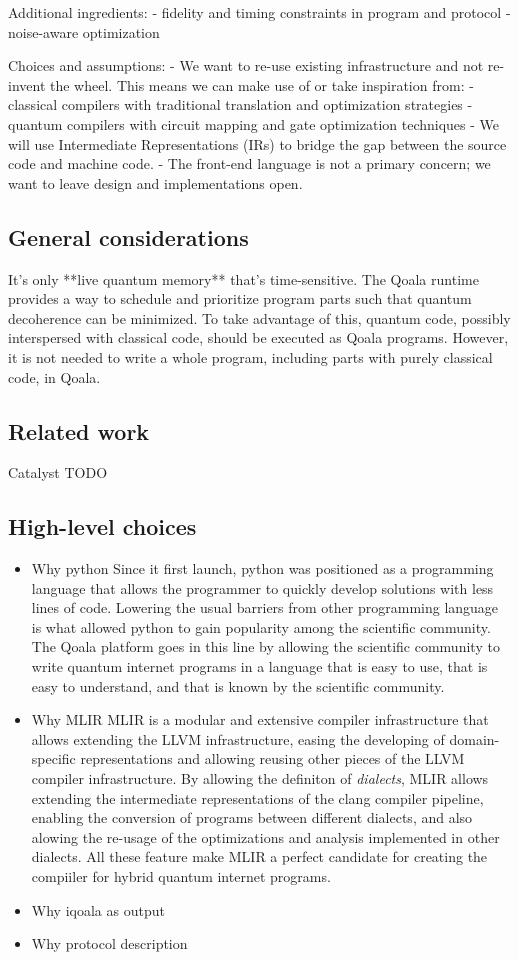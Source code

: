 Additional ingredients:
- fidelity and timing constraints in program and protocol
- noise-aware optimization


Choices and assumptions:
- We want to re-use existing infrastructure and not re-invent the wheel. This means we can make use of or take inspiration from:
  - classical compilers with traditional translation and optimization strategies
  - quantum compilers with circuit mapping and gate optimization techniques
- We will use Intermediate Representations (IRs) to bridge the gap between the source code and machine code.
- The front-end language is not a primary concern; we want to leave design and implementations open.

\subsection{General considerations}
It's only **live quantum memory** that's time-sensitive.
The Qoala runtime provides a way to schedule and prioritize program parts such that quantum decoherence can be minimized.
To take advantage of this, quantum code, possibly interspersed with classical code, should be executed as Qoala programs.
However, it is not needed to write a whole program, including parts with purely classical code, in Qoala.


\subsection{Related work}
Catalyst
TODO

\subsection{High-level choices}
\begin{itemize}
\item Why python
  Since it first launch, python was positioned as a programming language that allows the programmer to quickly develop
  solutions with less lines of code. Lowering the usual barriers from other programming language is what allowed python
  to gain popularity among the scientific community.
  The Qoala platform goes in this line by allowing the scientific community to write quantum internet programs in a
  language that is easy to use, that is easy to understand, and that is known by the scientific community.
\item Why MLIR
  MLIR is a modular and extensive compiler infrastructure that allows extending the LLVM infrastructure, easing the
  developing of domain-specific representations and allowing reusing other pieces of the LLVM compiler infrastructure.
  By allowing the definiton of \textit{dialects}, MLIR allows extending the intermediate representations of the clang compiler
  pipeline, enabling the conversion of programs between different dialects, and also alowing the re-usage of the
  optimizations and analysis implemented in other dialects.
  All these feature make MLIR a perfect candidate for creating the compiiler for hybrid quantum internet programs.
\item Why iqoala as output
\item Why protocol description
\end{itemize}
    

